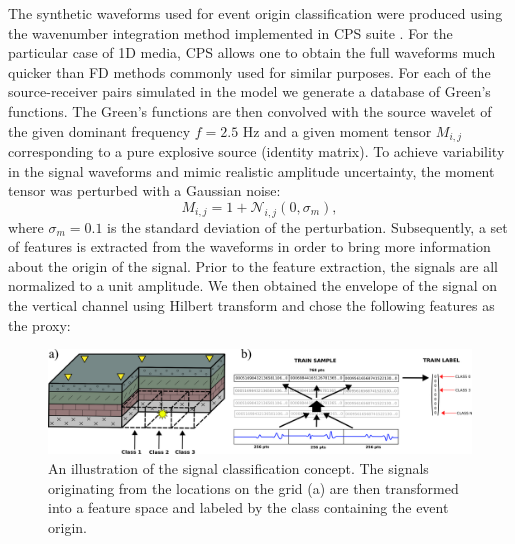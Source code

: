 \documentclass[letterpaper,11pt]{article}
\begin{document}
The synthetic waveforms used for event origin classification were produced using the wavenumber integration method implemented in CPS suite \citep{herrmann_computer_2013}. For the particular case of 1D media, CPS allows one to obtain the full waveforms much quicker than FD methods commonly used for similar purposes. For each of the source-receiver pairs simulated in the model we generate a database of Green's functions. The Green's functions are then convolved with the source wavelet of the given dominant frequency $f = 2.5$ Hz and a given moment tensor $M_{i,j}$ corresponding to a pure explosive source (identity matrix). To achieve variability in the signal waveforms and mimic realistic amplitude uncertainty, the moment tensor was perturbed with a Gaussian noise:
\begin{equation}
 M_{i,j} = 1 + \mathcal{N}_{i,j}(0,\sigma_{m}),
\end{equation}
where $\sigma_{m} = 0.1$ is the standard deviation of the perturbation. Subsequently, a set of features is extracted from the waveforms in order to bring more information about the origin of the signal. Prior to the feature extraction, the signals are all normalized to a unit amplitude. We then obtained the envelope of the signal on the vertical channel using Hilbert transform and chose the following features as the proxy:
\begin{figure}[htb]
\begin{center}
\includegraphics[width=0.7\linewidth,angle=0]{./AntonBiryukov_bibtex/classes.png}
\end{center}
\vspace{-4mm}
\caption{An illustration of the signal classification concept. The signals originating from the locations on the grid (a) are then transformed into a feature space and labeled by the class containing the event origin.}
\label{fig:classes}
\end{figure}
\end{document}
